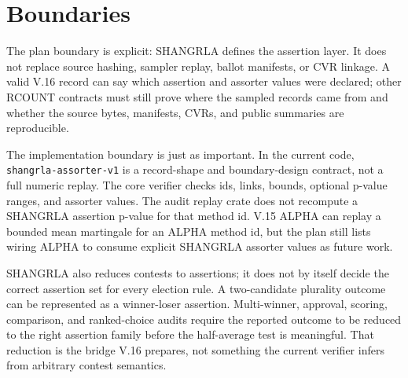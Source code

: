\section{Boundaries}

The plan boundary is explicit: SHANGRLA defines the assertion layer. It does not
replace source hashing, sampler replay, ballot manifests, or CVR linkage. A
valid V.16 record can say which assertion and assorter values were declared;
other RCOUNT contracts must still prove where the sampled records came from and
whether the source bytes, manifests, CVRs, and public summaries are reproducible.

The implementation boundary is just as important. In the current code,
\texttt{shangrla-assorter-v1} is a record-shape and boundary-design contract,
not a full numeric replay. The core verifier checks ids, links, bounds, optional
p-value ranges, and assorter values. The audit replay crate does not recompute a
SHANGRLA assertion p-value for that method id. V.15 ALPHA can replay a bounded
mean martingale for an ALPHA method id, but the plan still lists wiring ALPHA to
consume explicit SHANGRLA assorter values as future work.

SHANGRLA also reduces contests to assertions; it does not by itself decide the
correct assertion set for every election rule. A two-candidate plurality outcome
can be represented as a winner-loser assertion. Multi-winner, approval, scoring,
comparison, and ranked-choice audits require the reported outcome to be reduced
to the right assertion family before the half-average test is meaningful. That
reduction is the bridge V.16 prepares, not something the current verifier
infers from arbitrary contest semantics.
